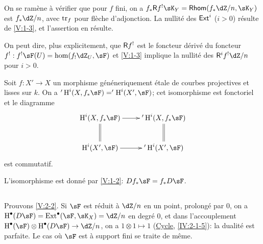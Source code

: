 On se ram\`ene \`a v\'erifier que pour $f$ fini, on a 
$f_\ast \R f^!\sK_Y = \rHom(f_\ast\dZ/n,\sK_Y)$ est $f_\ast\dZ/n$, avec $\operatorname{tr}_f$ 
pour fl\`eche d'adjonction. La nullit\'e des $\operatorname{\mathsf{Ext}}^i$ ($i>0$) r\'esulte de 
\ref{V:1-3}, et l'assertion en r\'esulte. 

On peut dire, plus explicitement, que $\mathsf{R} f^!$ est le foncteur d\'eriv\'e du 
foncteur $f^!:f^!\sF(U)=\hom(f_!\dZ_U,\sF)$ et \ref{V:1-3} implique la 
nullit\'e des $\R^i f^!\dZ/n$ pour $i>0$.





\begin{corollary_}\label{V:2-4}
Soit $f:X'\to X$ un morphisme g\'en\'eneriquement \'etale de courbes 
projectives et lisses sur $k$. On a $'\h^i(X,f_\ast \sF)='\h^i(X',\sF)$; cet 
isomorphisme est fonctoriel et le diagramme 
\[\xymatrix{
  \h^i(X,f_\ast\sF) \ar[r] \ar@{=}[d] 
    & '\h^i(X,f_\ast\sF) \ar@{=}[d] \\
  \h^i(X',\sF) \ar[r] 
    & '\h^i(X',\sF) 
}\]
est commutatif.
\end{corollary_}

L'isomorphisme est donn\'e par \ref{V:1-2}: $D f_\ast\sF=f_\ast D\sF$. 





\subsection{}\label{V:2-5}

Prouvons \ref{V:2-2}. Si $\sF$ est r\'eduit \`a $\dZ/n$ en un point, prolong\'e 
par $0$, on a $\h^\bullet(D\sF) = \ext^\bullet(\sF,\sK_X)=\dZ/n$ en degr\'e 
$0$, et dans l'accouplement $\h^\bullet(\sF)\otimes\h^\bullet(D\sF) \to \dZ/n$, 
on a $1\otimes 1\mapsto 1$ (\hyperref[IV]{Cycle}, \ref{IV:2-1-5}): la dualit\'e 
est parfaite. Le cas o\`u $\sF$ est \`a support fini se traite de m\^eme. 

